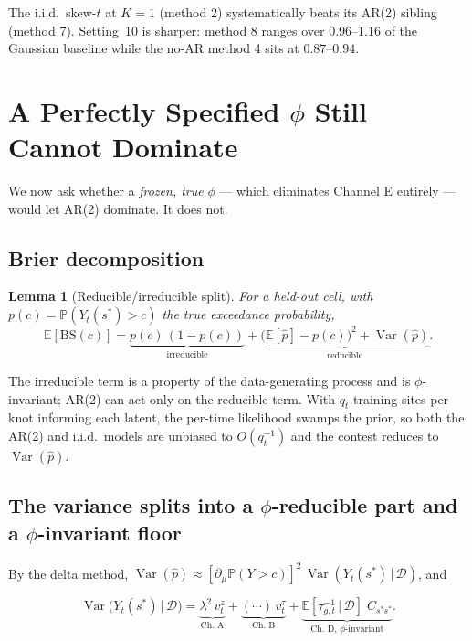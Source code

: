 \documentclass[11pt]{article}
\newtheorem{lemma}{Lemma}
\theoremstyle{definition}
\newcommand{\E}{\mathbb{E}}
\newcommand{\Var}{\operatorname{Var}}
\renewcommand{\Pr}{\mathbb{P}}
\newcommand{\D}{\mathcal{D}}
\newcommand{\given}{\,\vert\,}
\begin{document}
The i.i.d.\ skew-$t$ at $K=1$ (method 2) systematically beats its
AR(2) sibling (method 7). Setting~10 is sharper: method 8 ranges over
$0.96$--$1.16$ of the Gaussian baseline while the no-AR method 4 sits
at $0.87$--$0.94$.

\section{A Perfectly Specified $\phi$ Still Cannot Dominate}
\label{sec:frozen}

We now ask whether a \emph{frozen, true} $\phi$ --- which eliminates
Channel E entirely --- would let AR(2) dominate. It does not.

\subsection{Brier decomposition}

\begin{lemma}[Reducible/irreducible split]
\label{lem:brier-split}
For a held-out cell, with $p(c) = \Pr(Y_t(s^*) > c)$ the true
exceedance probability,
\begin{equation}
  \E[\mathrm{BS}(c)]
    = \underbrace{p(c)\,(1 - p(c))}_{\text{irreducible}}
    + \underbrace{\big(\E[\hat p] - p(c)\big)^2 + \Var(\hat p)}
        _{\text{reducible}}.
  \label{eq:brier-split}
\end{equation}
\end{lemma}

The irreducible term is a property of the data-generating process and
is $\phi$-invariant; AR(2) can act only on the reducible term. With
$q_t$ training sites per knot informing each latent, the per-time
likelihood swamps the prior, so both the AR(2) and i.i.d.\ models are
unbiased to $O(q_t^{-1})$ and the contest reduces to $\Var(\hat p)$.

\subsection{The variance splits into a $\phi$-reducible part and a
$\phi$-invariant floor}

By the delta method, $\Var(\hat p) \approx [\partial_\mu \Pr(Y>c)]^2\,
\Var(Y_t(s^*) \given \D)$, and

\begin{equation}
  \Var\big(Y_t(s^*) \given \D\big)
    = \underbrace{\lambda^2\, v_t^z}_{\text{Ch.\ A}}
    + \underbrace{(\cdots)\, v_t^\tau}_{\text{Ch.\ B}}
    + \underbrace{\E[\tau_{g,t}^{-1} \given \D]\; C_{s^* s^*}}
        _{\text{Ch.\ D, } \phi\text{-invariant}}.
  \label{eq:var-split}
\end{equation}
\end{document}
